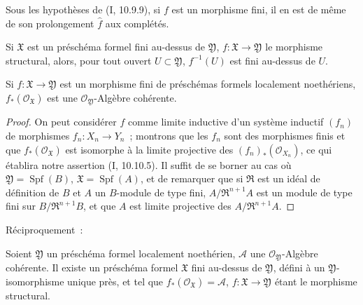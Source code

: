 \begin{corollary}[4.8.4]
\label{III.4.8.4-fr}
Sous les hypothèses de (I, 10.9.9), si $f$ est un morphisme fini, il en est de
même de son prolongement $\widehat f$ aux complétés.
\end{corollary}

\begin{corollary}[4.8.5]
\label{III.4.8.5-fr}
Si $\mathfrak X$ est un préschéma formel fini au-dessus de $\mathfrak Y$,
$f:\mathfrak X\to\mathfrak Y$ le morphisme structural, alors, pour tout ouvert
$U\subset\mathfrak Y$, $f^{-1}(U)$ est fini au-dessus de $U$.
\end{corollary}

\begin{proposition}[4.8.6]
\label{III.4.8.6-fr}
Si $f:\mathfrak X\to\mathfrak Y$ est un morphisme fini de préschémas formels
localement noethériens, $f_*(\mathcal O_{\mathfrak X})$ est une
$\mathcal O_{\mathfrak Y}$-Algèbre cohérente.
\end{proposition}

\begin{proof}
On peut considérer $f$ comme limite inductive d'un système inductif $(f_n)$ de
morphismes $f_n:X_n\to Y_n$~; montrons que les $f_n$ sont des morphismes finis
et que $f_*(\mathcal O_{\mathfrak X})$ est isomorphe à la limite projective des
$(f_n)_*(\mathcal O_{X_n})$, ce qui établira notre assertion (I, 10.10.5). Il
suffit de se borner au cas où $\mathfrak Y=\operatorname{Spf}(B)$,
$\mathfrak X=\operatorname{Spf}(A)$, et de remarquer que si $\mathfrak R$ est
un idéal de définition de $B$ et $A$ un $B$-module de type fini,
$A/\mathfrak R^{n+1}A$ est un module de type fini sur
$B/\mathfrak R^{n+1}B$, et que $A$ est limite projective des
$A/\mathfrak R^{n+1}A$.
\end{proof}

Réciproquement~:

\begin{proposition}[4.8.7]
\label{III.4.8.7-fr}
Soient $\mathfrak Y$ un préschéma formel localement noethérien, $\mathcal A$
une $\mathcal O_{\mathfrak Y}$-Algèbre cohérente. Il existe un préschéma
formel $\mathfrak X$ fini au-dessus de $\mathfrak Y$, défini à un
$\mathfrak Y$-isomorphisme unique près, et tel que
$f_*(\mathcal O_{\mathfrak X})=\mathcal A$, $f:\mathfrak X\to\mathfrak Y$
étant le morphisme structural.
\end{proposition}

